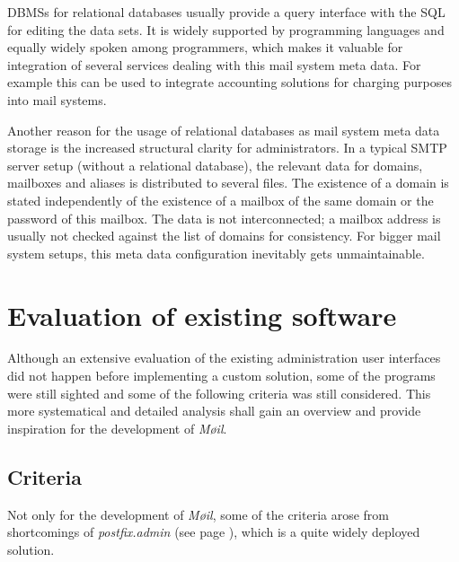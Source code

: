 \documentclass[12pt,a4paper]{scrartcl}
\begin{document}

		\acp{DBMS} for relational databases usually provide a query interface
		with the \ac{SQL} \cite{sql} for editing the data sets. It is widely
		supported by programming languages and equally widely spoken among
		programmers, which makes it valuable for integration of several
		services dealing with this mail system meta data. For example this can
		be used to integrate accounting solutions for charging purposes into
		mail systems.


		Another reason for the usage of relational databases as mail system
		meta data storage is the increased structural clarity for
		administrators. In a typical \acs{SMTP} \cite{smtp} server setup
		(without a relational database), the relevant data for domains,
		mailboxes and aliases is distributed to several files. The existence of
		a domain is stated independently of the existence of a mailbox of the
		same domain or the password of this mailbox. The data is not
		interconnected; a mailbox address is usually not checked against the
		list of domains for consistency. For bigger mail system setups, this
		meta data configuration inevitably gets unmaintainable.

	\section*{Evaluation of existing software}

		Although an extensive evaluation of the existing administration user
		interfaces did not happen before implementing a custom solution, some
		of the programs were still sighted and some of the following criteria
		was still considered. This more systematical and detailed analysis
		shall gain an overview and provide inspiration for the development of
		\emph{Møil}.

		\subsection*{Criteria}
			Not only for the development of \emph{Møil}, some of the criteria
			arose from shortcomings of \emph{postfix.admin} (see page
			\pageref{sec:contestants:postfix.admin}), which is a quite widely
			deployed solution.
\end{document}
